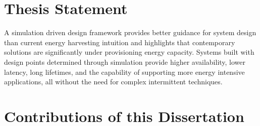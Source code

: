 \section{Thesis Statement}

A simulation driven design framework provides better guidance for system design than current energy harvesting intuition and highlights that contemporary solutions are significantly under provisioning energy capacity. Systems built with design points determined through simulation provide higher availability, lower latency, long lifetimes, and the capability of supporting more energy intensive applications, all without the need for complex intermittent techniques.

\the\textwidth

\section{Contributions of this Dissertation}


